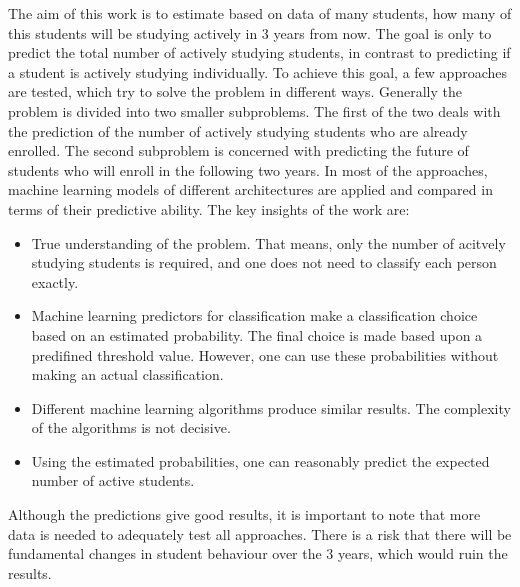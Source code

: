 
The aim of this work is to estimate based on data of many students, how many of this students will be studying
actively in 3 years from now. The goal is only to predict the total number of actively studying students,
in contrast to predicting if a student is actively studying individually.
To achieve this goal, a few approaches are tested, which try to solve the problem in different ways.
Generally the problem is divided into two smaller subproblems. The first of the two deals with the prediction of the number of
actively studying students who are already enrolled.
The second subproblem is concerned with predicting the future of students who will enroll in the following two years.
In most of the approaches, machine learning models of different architectures are applied and compared in terms of their predictive ability. 
The key insights of the work are:
\begin{itemize}
	\item True understanding of the problem. That means, only the number of acitvely studying students
	      is required, and one does not need to classify each person exactly.
	\item Machine learning predictors for classification make a classification choice based on an estimated probability.
	      The final choice is made based upon a predifined threshold value. However, one can use these probabilities without making an
	      actual classification.
	\item Different machine learning algorithms produce similar results. The complexity of the algorithms is not decisive.
	\item Using the estimated probabilities, one can reasonably predict the expected number of active students.
\end{itemize}

Although the predictions give good results, it is important to note that more data is needed to adequately test all approaches.
There is a risk that there will be fundamental changes in student behaviour over the 3 years, which would ruin the results.


